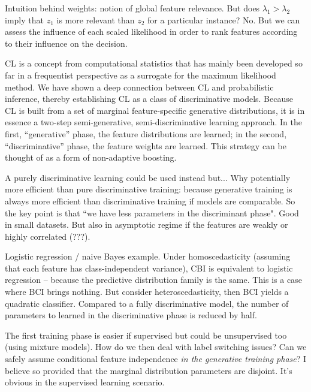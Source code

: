\documentclass[english]{scrartcl}
\begin{document}
Intuition behind weights: notion of global feature relevance. But does $\lambda_1>\lambda_2$ imply that $z_1$ is more relevant than $z_2$ for a particular instance? No. But we can assess the influence of each scaled likelihood in order to rank features according to their influence on the decision.

CL is a concept from computational statistics that has mainly been developed so far in a frequentist perspective as a surrogate for the maximum likelihood method. We have shown a deep connection between CL and probabilistic inference, thereby establishing CL as a class of discriminative models. Because CL is built from a set of marginal feature-specific generative distributions, it is in essence a two-step semi-generative, semi-discriminative learning approach. In the first, ``generative'' phase, the feature distributions are learned; in the second, ``discriminative'' phase, the feature weights are learned. This strategy can be thought of as a form of non-adaptive boosting.


A purely discriminative learning could be used instead but...
Why potentially more efficient than pure discriminative training: because generative training is always more efficient than discriminative training if models are comparable. So the key point is that ``we have less parameters in the discriminant phase". Good in small datasets. But also in asymptotic regime if the features are weakly or highly correlated (???).

Logistic regression / naive Bayes example. Under homoscedasticity (assuming that each feature has class-independent variance), CBI is equivalent to logistic regression -- because the predictive distribution family is the same. This is a case where BCI brings nothing. But consider heteroscedasticity, then BCI yields a quadratic classifier. Compared to a fully discriminative model, the number of parameters to learned in the discriminative phase is reduced by half.

The first training phase is easier if supervised but could be unsupervised too (using mixture models). How do we then deal with label switching issues? Can we safely assume conditional feature independence {\em in the generative training phase}? I believe so provided that the marginal distribution parameters are disjoint. It's obvious in the supervised learning scenario.
\end{document}
